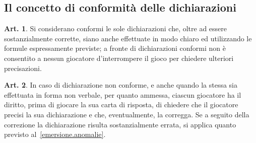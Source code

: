 \documentclass[italian,a4paper]{book}
\theoremstyle{definition}
\newtheorem{art}{Art.}
\begin{document}
\subsection{Il concetto di conformità delle dichiarazioni}
\begin{art}
Si considerano conformi le sole dichiarazioni che, oltre ad essere sostanzialmente corrette, siano anche effettuate in modo chiaro ed utilizzando le formule espressamente previste; a fronte di dichiarazioni conformi non è consentito a nessun giocatore d'interrompere il gioco per chiedere ulteriori precisazioni.
\end{art}
\begin{art}
In caso di dichiarazione non conforme, e anche quando la stessa sia
effettuata in forma non verbale, per quanto ammessa, ciascun giocatore ha il
diritto, prima di giocare la sua carta di risposta, di chiedere che il
giocatore precisi la sua dichiarazione e che, eventualmente, la corregga. Se
a seguito della correzione la dichiarazione risulta sostanzialmente errata,
si applica quanto previsto al~\ref{emersione.anomalie}.
\end{art}
\end{document}

